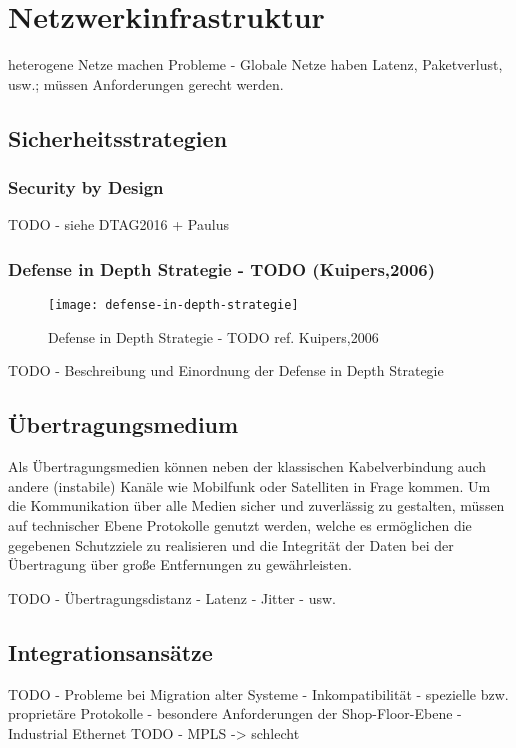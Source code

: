 \section{Netzwerkinfrastruktur}
heterogene Netze machen Probleme - Globale Netze haben Latenz, Paketverlust, usw.; müssen Anforderungen gerecht werden.

\subsection{Sicherheitsstrategien}
\subsubsection{Security by Design}
TODO - siehe DTAG2016 + Paulus

\subsubsection{Defense in Depth Strategie - TODO (Kuipers,2006)}

\begin{figure}[h]
    \centering
    \texttt{[image: defense-in-depth-strategie]}
    \caption{Defense in Depth Strategie - TODO ref. Kuipers,2006}
    \label{Kap3:Defense-in-Depth}
\end{figure}

\clearpage

TODO - Beschreibung und Einordnung der Defense in Depth Strategie

\subsection{Übertragungsmedium}
Als Übertragungsmedien können neben der klassischen Kabelverbindung auch andere (instabile) Kanäle wie Mobilfunk oder Satelliten in Frage kommen. Um die Kommunikation über alle Medien sicher und zuverlässig zu gestalten, müssen auf technischer Ebene Protokolle genutzt werden, welche es ermöglichen die gegebenen Schutzziele zu realisieren und die Integrität der Daten bei der Übertragung über große Entfernungen zu gewährleisten.

TODO - Übertragungsdistanz - Latenz - Jitter - usw.

\subsection{Integrationsansätze}
TODO - Probleme bei Migration alter Systeme - Inkompatibilität - spezielle bzw. proprietäre Protokolle - besondere Anforderungen der Shop-Floor-Ebene - Industrial Ethernet
TODO - MPLS -> schlecht

